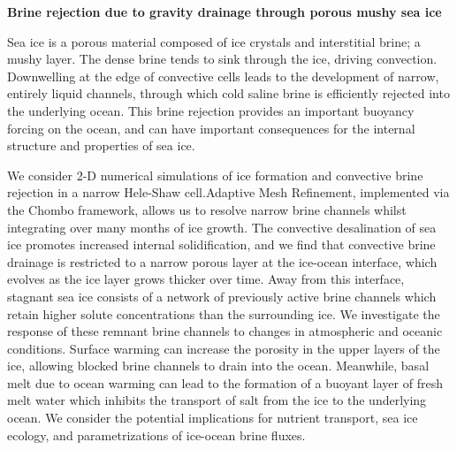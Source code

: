 \documentclass[]{article}
\begin{document}
\noindent \textbf{Brine rejection due to gravity drainage through porous mushy sea ice}

\noindent Sea ice is a porous material composed of ice crystals and interstitial brine; a mushy layer. The dense brine tends to sink through the ice, driving convection. Downwelling at the edge of convective cells leads to the development of narrow, entirely liquid channels, through which cold saline brine is efficiently rejected into the underlying ocean. This brine rejection provides an important buoyancy forcing on the ocean, and can have important consequences
for the internal structure and properties of sea ice.

We consider 2-D numerical simulations of ice formation and convective brine rejection in a narrow Hele-Shaw cell.Adaptive Mesh Refinement, implemented via the Chombo framework, allows us to resolve narrow brine channels whilst integrating over many months of ice growth. The convective desalination of sea ice promotes increased internal solidification, and we find that convective brine drainage is restricted to a narrow porous layer at the ice-ocean interface, which evolves as the ice layer grows thicker over time. Away from this interface, stagnant sea ice consists of a network of previously active brine channels which retain higher solute concentrations than the surrounding ice. We investigate the response of these remnant brine channels to changes in atmospheric and oceanic conditions. Surface warming can increase the porosity in the upper layers of the ice, allowing blocked brine channels to drain into the ocean. Meanwhile, basal melt due to ocean warming can lead to the formation of a buoyant layer of fresh melt water which inhibits the transport of salt from the ice to the underlying ocean. We consider the potential implications for nutrient transport, sea ice ecology, and parametrizations of ice-ocean brine fluxes. 
\end{document}
